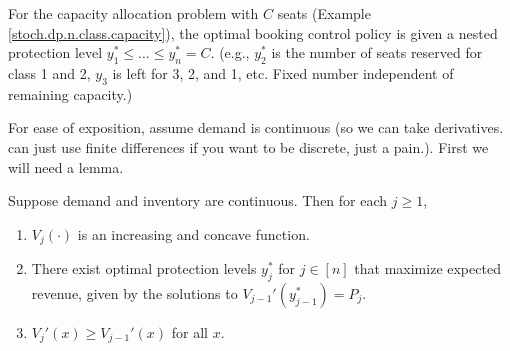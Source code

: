 \begin{theorem}\label{stoch.dp.n.class.capacity.thm}

For the capacity allocation problem with \(C\) seats (Example \ref{stoch.dp.n.class.capacity}), the optimal booking control policy is given a nested protection level \(y_1^* \leq \ldots \leq y_n^* = C\). (e.g., \(y_2^*\) is the number of seats reserved for class 1 and 2, \(y_3\) is left for 3, 2, and 1, etc. Fixed number independent of remaining capacity.)

\end{theorem}

For ease of exposition, assume demand is continuous (so we can take derivatives. can just use finite differences if you want to be discrete, just a pain.). First we will need a lemma.

\begin{lemma}\label{stoch.dp.n.class.capacity.thm.lemma}

Suppose demand and inventory are continuous. Then for each \(j \geq 1\), 

\begin{enumerate}



\item \(V_j(\cdot)\) is an increasing and concave function.

\item There exist optimal protection levels \(y_j^*\) for \(j \in [n]\) that maximize expected revenue, given by the solutions to \(V_{j-1}' (y_{j-1}^*) = P_j\).

\item \(V_j'(x) \geq V_{j-1}'(x)\) for all \(x\).

\end{enumerate}

\end{lemma}

